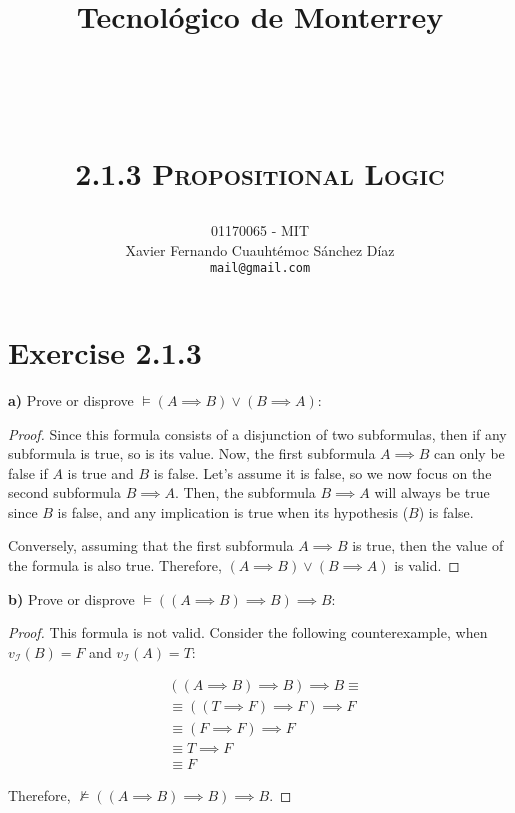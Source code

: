 \documentclass[titlepage, letterpaper, fleqn]{article}
\title{
\vspace{1in}
\textbf{Tecnológico de Monterrey} \\
\vspace{0.5in}
\textmd{\mahclass} \\
\large{\textit{\mahteacher}} \\
\vspace{0.5in}
\textsc{\mahtitle}\\
\textsc{2.1.3 Propositional Logic}\\
\author{01170065  - MIT \\
Xavier Fernando Cuauhtémoc Sánchez Díaz \\
\texttt{mail@gmail.com}}
\date{\mahdate}
}
\newcommand{\spacepls}{\vspace{5mm}}
\begin{document}
\begin{titlepage}
\maketitle
\end{titlepage}

%
%

\section{Exercise 2.1.3}

{\large \textbf{a)} Prove or disprove \(\models (A \implies B) \vee (B \implies A)\):}

\begin{proof}
Since this formula consists of a disjunction of two subformulas, then if any subformula is true, so is its value.
Now, the first subformula \(A \implies B\) can only be false if \(A\) is true and \(B\) is false.
Let's assume it is false, so we now focus on the second subformula \(B \implies A\).
Then, the subformula \(B \implies A\) will always be true since \(B\) is false, and any implication is true when its hypothesis (\(B\)) is false.

Conversely, assuming that the first subformula \(A \implies B\) is true, then the value of the formula is also true.
Therefore, \((A \implies B) \vee (B \implies A)\) is valid.
\end{proof}

\spacepls

{\large \textbf{b)} Prove or disprove \(\models((A \implies B) \implies B) \implies B\):}

\begin{proof}
This formula is not valid. Consider the following counterexample, when \(v_{\mathscr{I}}(B) = F\) and \(v_{\mathscr{I}}(A) = T\):

\begin{align*}
& ((A \implies B) \implies B) \implies B \equiv \\
& \equiv ((T \implies F) \implies F) \implies F\\
& \equiv (F \implies F) \implies F\\
& \equiv T \implies F\\
& \equiv F
\end{align*}

Therefore, \(\not \models ((A \implies B) \implies B) \implies B\).
\end{proof}
\end{document}
